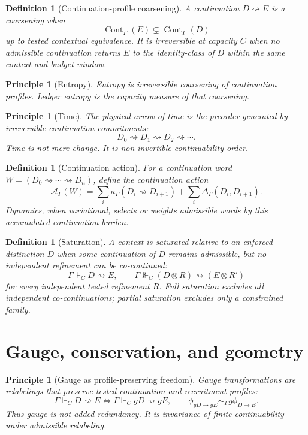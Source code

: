 \documentclass[11pt]{article}
\newtheorem{definition}[theorem]{Definition}
\newtheorem{principle}[theorem]{Principle}
\theoremstyle{remark}
\newcommand{\G}{\Gamma}
\newcommand{\entails}{\Vdash}
\newcommand{\goes}{\rightsquigarrow}
\newcommand{\Cont}{\operatorname{Cont}}
\newcommand{\Cost}{\kappa}
\begin{document}
\begin{definition}[Continuation-profile coarsening]
A continuation \(D\goes E\) is a coarsening when
\[
        \Cont_\G(E)\subsetneq \Cont_\G(D)
\]
up to tested contextual equivalence.  It is irreversible at capacity \(C\) when no admissible continuation returns \(E\) to the identity-class of \(D\) within the same context and budget window.
\end{definition}

\begin{principle}[Entropy]
Entropy is irreversible coarsening of continuation profiles.  Ledger entropy is the capacity measure of that coarsening.
\end{principle}

\begin{principle}[Time]
The physical arrow of time is the preorder generated by irreversible continuation commitments:
\[
        D_0\goes D_1\goes D_2\goes\cdots .
\]
Time is not mere change.  It is non-invertible continuability order.
\end{principle}

\begin{definition}[Continuation action]
For a continuation word \(W=(D_0\goes\cdots\goes D_n)\), define the continuation action
\[
        \mathcal A_\G(W)
        =
        \sum_i \Cost_\G(D_i\goes D_{i+1})
        +
        \sum_i \Delta_\G(D_i,D_{i+1}).
\]
Dynamics, when variational, selects or weights admissible words by this accumulated continuation burden.
\end{definition}

\begin{definition}[Saturation]
A context is saturated relative to an enforced distinction \(D\) when some continuation of \(D\) remains admissible, but no independent refinement can be co-continued:
\[
        \G\entails_C D\goes E,
        \qquad
        \G\nVdash_C (D\otimes R)\goes(E\otimes R')
\]
for every independent tested refinement \(R\).  Full saturation excludes all independent co-continuations; partial saturation excludes only a constrained family.
\end{definition}

\section{Gauge, conservation, and geometry}

\begin{principle}[Gauge as profile-preserving freedom]
Gauge transformations are relabelings that preserve tested continuation and recruitment profiles:
\[
        \G\entails_C D\goes E
        \Longleftrightarrow
        \G\entails_C gD\goes gE,
        \qquad
        \phi_{gD\to gE}\sim_\G g\phi_{D\to E}.
\]
Thus gauge is not added redundancy.  It is invariance of finite continuability under admissible relabeling.
\end{principle}
\end{document}
